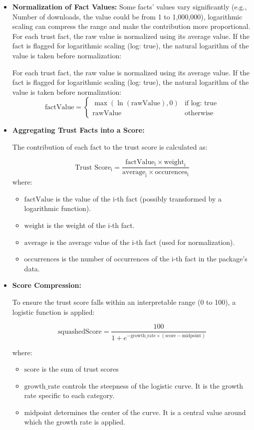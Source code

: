 \documentclass[10pt,conference]{IEEEtran}
\begin{document}
\begin{itemize}
    \item \textbf{Normalization of Fact Values:}
Some facts' values vary significantly (e.g., Number of downloads, the value could be from 1 to 1,000,000), logarithmic scaling can compress the range and make the contribution more proportional. For each trust fact, the raw value is normalized using its average value. If the fact is flagged for logarithmic scaling (log: true), the natural logarithm of the value is taken before normalization:

For each trust fact, the raw value is normalized using its average value. If the fact is flagged for logarithmic scaling ({log: true}), the natural logarithm of the value is taken before normalization:
\[
\text{factValue} =
\begin{cases}
\max(\ln(\text{rawValue}), 0) & \text{if log: true} \\
\text{rawValue} & \text{otherwise}
\end{cases}
\]



    \item  \textbf{Aggregating Trust Facts into a Score:}

The contribution of each fact to the trust score is calculated as:

\[
\text{Trust Score}_{\text{i}} = \frac{\text{factValue}_{\text{i}} \times \text{weight}_{\text{i}}}{{\text{average}_{\text{i}} \times \text{occurences}_{\text{i}}}}
\]
where:
\begin{itemize}
    \item \(\text{factValue}\) is the value of the i-th fact (possibly transformed by a logarithmic function).
    \item \(\text{weight}\) is the weight of the i-th fact.
    \item \(\text{average}\) is the average value of the i-th fact (used for normalization).
    \item \(\text{occurrences}\) is the number of occurrences of the i-th fact in the package's data.
\end{itemize}

\item \textbf{Score Compression:}

To ensure the trust score falls within an interpretable range (0 to 100), a logistic function is applied:


\[
\text{squashedScore} =
\frac{100}{1 + e^{-\text{growth\_rate} \times (\text{score} - \text{midpoint})}}
\]

where:
\begin{itemize}
    \item \(\text{score}\) is the sum of trust scores
    \item \(\text{growth\_rate}\) controls the steepness of the logistic curve. It is the growth rate specific to each category.
    \item \(\text{midpoint}\) determines the center of the curve. It is a central value around which the growth rate is applied.
\end{itemize}

\end{itemize}
\end{document}
